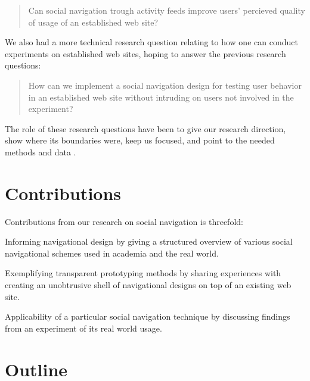 \begin{quote}
  Can social navigation trough activity feeds improve users' percieved
  quality of usage of an established web site?
\end{quote}

We also had a more technical research question relating to how one can
conduct experiments on established web sites, hoping to answer the previous
research questions:

\begin{quote}
  How can we implement a social navigation design for
  testing user behavior in an established web site without
  intruding on users not involved in the experiment?
\end{quote}

The role of these research questions have been to give our research direction,
show where its boundaries were, keep us focused, and point to the needed
methods and data \citep[]{silverman05}.

%

\section{Contributions}

Contributions from our research on social navigation is threefold:

\begin{enum}
  \item Informing navigational design by giving a structured overview of
    various social navigational schemes used in academia and the real world.
  \item Exemplifying transparent prototyping methods by sharing experiences
    with creating an unobtrusive shell of navigational designs on top of an
    existing web site.
  \item Applicability of a particular social navigation technique
    by discussing findings from an experiment of its real world usage.
\end{enum}

\section{Outline}

